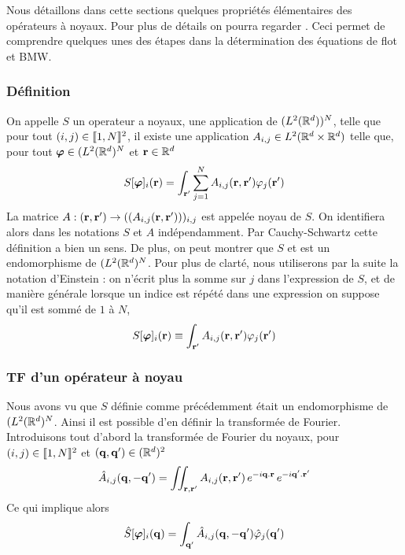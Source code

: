 \documentclass[10pt]{article}
\begin{document}
\begin{multicols}{2}
Nous détaillons dans cette sections quelques propriétés élémentaires des opérateurs à noyaux. Pour plus de détails on pourra regarder \cite{}. Ceci permet de comprendre quelques unes des étapes dans la détermination des équations de flot et BMW. \\



\subsubsection{Définition}

On appelle $S$ un operateur a noyaux, une application de $(L^2(\mathbb{R}^d))^N$, telle que pour tout $(i,j) \in  \llbracket 1,N \rrbracket ^2$, il existe une application $A_{i,j} \in L^2(\mathbb{R}^d\times\mathbb{R}^d)$ telle que,  pour tout $\boldsymbol{ \varphi} \in (L^2(\mathbb{R}^d)^N$ et ${\bf r} \in \mathbb{R}^d$
 \begin{equation}
  S[\boldsymbol{ \varphi}]_i({\bf r}) = \int_{{\bf r}'} \sum_{j=1}^{N} A_{i,j}({\bf r},{\bf r}')\varphi_j({\bf r}')
 \end{equation}
 La matrice $A : ({\bf r},{\bf r}') \rightarrow ((A_{i,j}({\bf r},{\bf r}')))_{i,j}$ est appelée noyau de $S$.  On identifiera alors dans les notations $S$ et $A$ indépendamment. Par Cauchy-Schwartz cette définition a bien  un sens. De plus, on peut montrer que $S$ et est un endomorphisme de $(L^2(\mathbb{R}^d)^N$. Pour plus de clarté, nous utiliserons par la suite la notation d'Einstein : on n'écrit plus la somme sur $j$ dans l'expression de $S$, et de manière générale lorsque un indice est répété dans une expression on suppose qu'il est sommé de $1$ à $N$, 
  \begin{equation}
  S[\boldsymbol{ \varphi}]_i({\bf r}) \equiv \int_{{\bf r}'} A_{i,j}({\bf r},{\bf r}')\varphi_j({\bf r}')
 \end{equation}
 



\vspace*{11pt}

\subsubsection{TF d'un opérateur à noyau}

Nous avons vu que $S$ définie comme précédemment était un endomorphisme de $(L^2(\mathbb{R}^d)^N$. Ainsi il est possible d'en définir la transformée de Fourier. Introduisons tout d'abord la transformée de Fourier du noyaux, pour $(i,j) \in  \llbracket 1,N \rrbracket ^2$ et $({\bf q}, {\bf q}') \in (\mathbb{R}^d)^2 $
\begin{equation}
	 \hat{A}_{i,j}({\bf q}, -{\bf q}') = \iint_{{\bf r},{\bf r}'} A_{i,j}({\bf r},{\bf r}')\,e^{-i{\bf q}.{\bf r}} \, e^{-i {\bf q}'.{\bf r}'} 
\end{equation}
Ce qui implique alors 
\begin{equation}
	 \hat{S}[\boldsymbol{ \varphi}]_i({\bf q}) = \int_{{\bf q}'} \hat{A}_{i,j}({\bf q}, -{\bf q}') \hat{\varphi}_j({\bf q}')
\end{equation}




\end{multicols}
\end{document}
